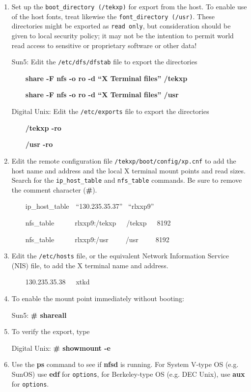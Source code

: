 \documentclass[11pt]{article}
\begin{document}
\begin {enumerate}

\item Set up the {\tt boot\_directory (/tekxp)} for export from the host. To
enable use of the host fonts, treat likewise the {\tt font\_directory (/usr)}.
These directories might be exported as {\tt read only}, but consideration
should be given to local security policy; it may not be the intention to
permit world read access to sensitive or proprietary software or other data!

Sun5: Edit the {\tt /etc/dfs/dfstab} file to export the directories

\ \ \ \ {\bf share -F nfs -o ro -d ``X Terminal files'' /tekxp}

\ \ \ \ {\bf share -F nfs -o ro -d ``X Terminal files'' /usr}

Digital Unix: Edit the {\tt /etc/exports} file to export the directories

\ \ \ \ {\bf /tekxp -ro}

\ \ \ \ {\bf /usr -ro}

\item Edit the remote configuration file {\tt /tekxp/boot/config/xp.cnf} to add
the host name and address and the local X terminal mount points and read sizes.
Search for the {\tt ip\_host\_table} and {\tt nfs\_table} commands. Be sure to
remove the comment character ({\bf \#}).

\ \ \ \ ip\_host\_table\ \ ``130.235.35.37'' \ ``rlxxp9''

\ \ \ \ nfs\_table\ \ \ \ \ \ rlxxp9:/tekxp\ \ \ /tekxp\ \ \ 8192

\ \ \ \ nfs\_table\ \ \ \ \ \ rlxxp9:/usr\ \ \ \ \ /usr\ \ \ \ \ 8192

\item Edit the {\tt /etc/hosts} file, or the equivalent Network Information
Service (NIS) file, to add the X terminal name and address.

\ \ \ \ 130.235.35.38\ \ \ xtkd

\item To enable the mount point immediately without booting:

Sun5: {\bf \# shareall}

\item To verify the export, type

Digital Unix: {\bf \# showmount -e}

\item Use the {\bf ps} command to see if {\bf nfsd} is running. For System
V-type OS (e.g. SunOS) use {\bf edf} for {\tt options}, for Berkeley-type OS
(e.g. DEC Unix), use {\bf aux} for {\tt options}.


\end{enumerate}
\end{document}
